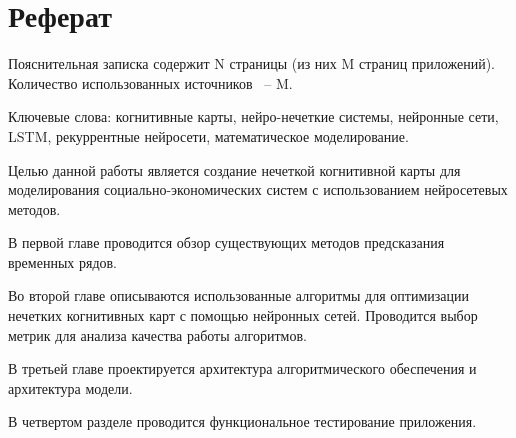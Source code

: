 \chapter*{Реферат}
\thispagestyle{plain}

Пояснительная записка содержит N страницы (из них M страниц приложений). Количество использованных источников ~-- M.

Ключевые слова: когнитивные карты, нейро-нечеткие системы,
нейронные сети, LSTM, рекуррентные нейросети, математическое моделирование.

Целью данной работы является создание нечеткой когнитивной карты для моделирования
социально-экономических систем с использованием нейросетевых методов.

В первой главе проводится обзор существующих методов предсказания временных рядов.

Во второй главе описываются использованные алгоритмы для оптимизации нечетких
когнитивных карт с помощью нейронных сетей.
Проводится выбор метрик для анализа качества работы алгоритмов.

В третьей главе проектируется архитектура алгоритмического обеспечения
и архитектура модели.

В четвертом разделе проводится функциональное тестирование приложения.
